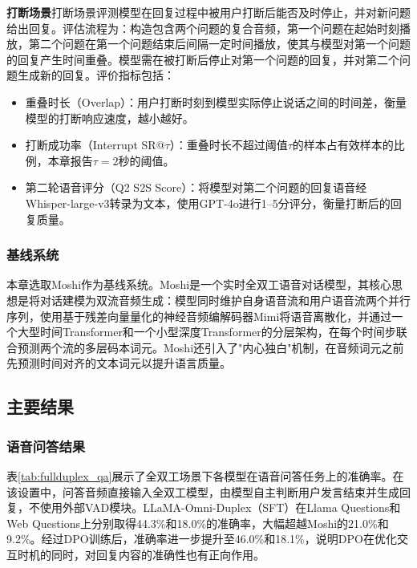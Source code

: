 \textbf{打断场景}\quad 打断场景评测模型在回复过程中被用户打断后能否及时停止，并对新问题给出回复。评估流程为：构造包含两个问题的复合音频，第一个问题在起始时刻播放，第二个问题在第一个问题结束后间隔一定时间播放，使其与模型对第一个问题的回复产生时间重叠。模型需在被打断后停止对第一个问题的回复，并对第二个问题生成新的回复。评价指标包括：
\begin{itemize}
    \item 重叠时长（Overlap）：用户打断时刻到模型实际停止说话之间的时间差，衡量模型的打断响应速度，越小越好。
    \item 打断成功率（Interrupt SR@$\tau$）：重叠时长不超过阈值$\tau$的样本占有效样本的比例，本章报告$\tau = 2$秒的阈值。
    \item 第二轮语音评分（Q2 S2S Score）：将模型对第二个问题的回复语音经Whisper-large-v3转录为文本，使用GPT-4o进行1--5分评分，衡量打断后的回复质量。
\end{itemize}

\subsubsection{基线系统}

本章选取Moshi\citep{kyutai2024moshi}作为基线系统。Moshi是一个实时全双工语音对话模型，其核心思想是将对话建模为双流音频生成：模型同时维护自身语音流和用户语音流两个并行序列，使用基于残差向量量化的神经音频编解码器Mimi将语音离散化，并通过一个大型时间Transformer和一个小型深度Transformer的分层架构，在每个时间步联合预测两个流的多层码本词元。Moshi还引入了"内心独白"机制，在音频词元之前先预测时间对齐的文本词元以提升语言质量。

\subsection{主要结果}

\subsubsection{语音问答结果}



表\ref{tab:fullduplex_qa}展示了全双工场景下各模型在语音问答任务上的准确率。在该设置中，问答音频直接输入全双工模型，由模型自主判断用户发言结束并生成回复，不使用外部VAD模块。LLaMA-Omni-Duplex（SFT）在Llama Questions和Web Questions上分别取得44.3\%和18.0\%的准确率，大幅超越Moshi的21.0\%和9.2\%。经过DPO训练后，准确率进一步提升至46.0\%和18.1\%，说明DPO在优化交互时机的同时，对回复内容的准确性也有正向作用。

